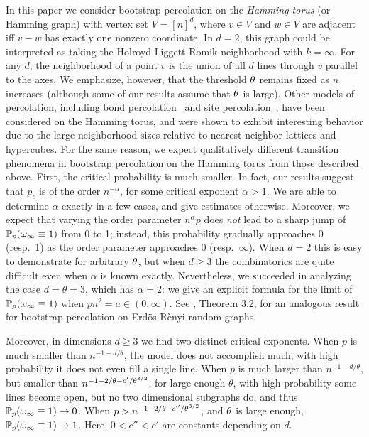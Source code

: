 In this paper we consider bootstrap percolation on the {\it Hamming torus\/} (or Hamming graph) with vertex set $V = [n]^d$, where $v\in V$ and $w\in V$ are adjacent iff $v-w$ has exactly one nonzero coordinate.  
In $d=2$, this graph could be interpreted as taking the Holroyd-Liggett-Romik neighborhood \cite{hlr} with $k=\infty$. For any $d$, the neighborhood of a point $v$ is the union of all $d$ lines through $v$ parallel to the axes. We emphasize, however, that the threshold $\theta$ remains fixed as $n$ increases (although some of our results assume that $\theta$ is large).  Other models of percolation, including bond percolation~\cite{BCHSS:2005, HL:2010} and site percolation~\cite{S:2010}, have been considered on the Hamming torus, and were shown to exhibit interesting behavior due to the large neighborhood sizes relative to nearest-neighbor lattices and hypercubes.  For the same reason, we expect qualitatively different transition phenomena in bootstrap percolation on the Hamming torus from those described above. First, the critical probability is much smaller. In fact, our results suggest that 
$p_c$ is of the order $n^{-\alpha}$, for some critical exponent $\alpha > 1$. We are able to determine $\alpha$ exactly in a few cases, and give estimates otherwise. Moreover, we expect that varying the order parameter $n^{\alpha}p$ does {\it not\/} lead to a sharp jump of $\mathbb{P}_{p}(\omega_\infty\equiv1)$ from 0 to 1; instead, this probability gradually approaches 0 (resp.~1) as the order parameter approaches 0 (resp.~$\infty$). When $d=2$ this is easy to demonstrate for arbitrary $\theta$, but when $d\ge 3$ the combinatorics are quite difficult even when $\alpha$ is known exactly. Nevertheless, we succeeded in analyzing the case $d=\theta=3$, which has $\alpha=2$: we give an explicit formula for the limit of $\mathbb{P}_{p} (\omega_\infty\equiv1)$ when $pn^2=a\in(0,\infty)$.  See \cite{JLTV}, Theorem 3.2, for an analogous result
for bootstrap percolation on Erd\"os-R\`enyi random graphs.


Moreover, in dimensions $d\ge 3$  we find two distinct critical exponents. When $p$ is much smaller than $n^{-1-d/\theta}$, the model does not accomplish much; with high probability it does not even fill a single line. When $p$ is much larger than $n^{-1-d/\theta}$, but smaller than $n^{-1-2/\theta-c'/\theta^{3/2}}$, for 
 large enough $\theta$, with high probability some lines become open, but no two dimensional subgraphs do, and thus $\mathbb{P}_{p}(\omega_\infty\equiv1)\to 0$. When $p>n^{-1-2/\theta-c''/\theta^{3/2}}$, and $\theta$ is large 
enough,
$\mathbb{P}_{p}(\omega_\infty\equiv1)\to 1$. Here, $0<c''<c'$ are constants depending on $d$.  

